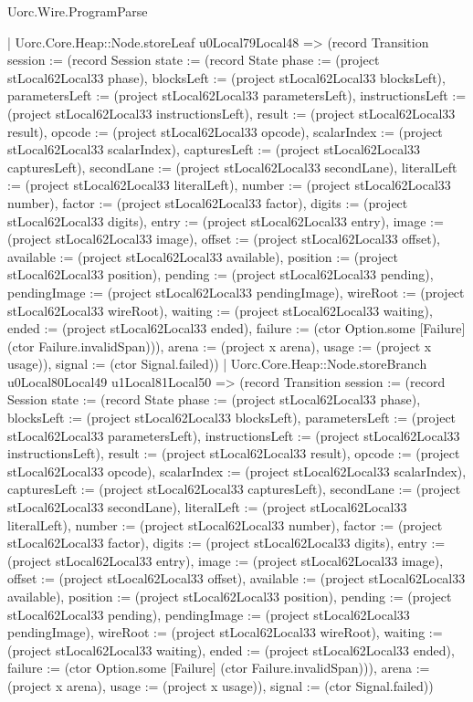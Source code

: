 \begin{lexlean}{Uorc.Wire.ProgramParse}
\begin{semanticmodule}
{        | Uorc.Core.Heap::Node.storeLeaf u0Local79Local48 => (record Transition {session := (record Session {state := (record State {phase := (project stLocal62Local33 phase), blocksLeft := (project stLocal62Local33 blocksLeft), parametersLeft := (project stLocal62Local33 parametersLeft), instructionsLeft := (project stLocal62Local33 instructionsLeft), result := (project stLocal62Local33 result), opcode := (project stLocal62Local33 opcode), scalarIndex := (project stLocal62Local33 scalarIndex), capturesLeft := (project stLocal62Local33 capturesLeft), secondLane := (project stLocal62Local33 secondLane), literalLeft := (project stLocal62Local33 literalLeft), number := (project stLocal62Local33 number), factor := (project stLocal62Local33 factor), digits := (project stLocal62Local33 digits), entry := (project stLocal62Local33 entry), image := (project stLocal62Local33 image), offset := (project stLocal62Local33 offset), available := (project stLocal62Local33 available), position := (project stLocal62Local33 position), pending := (project stLocal62Local33 pending), pendingImage := (project stLocal62Local33 pendingImage), wireRoot := (project stLocal62Local33 wireRoot), waiting := (project stLocal62Local33 waiting), ended := (project stLocal62Local33 ended), failure := (ctor Option.some [Failure] (ctor Failure.invalidSpan))}), arena := (project x arena), usage := (project x usage)}), signal := (ctor Signal.failed)})
        | Uorc.Core.Heap::Node.storeBranch u0Local80Local49 u1Local81Local50 => (record Transition {session := (record Session {state := (record State {phase := (project stLocal62Local33 phase), blocksLeft := (project stLocal62Local33 blocksLeft), parametersLeft := (project stLocal62Local33 parametersLeft), instructionsLeft := (project stLocal62Local33 instructionsLeft), result := (project stLocal62Local33 result), opcode := (project stLocal62Local33 opcode), scalarIndex := (project stLocal62Local33 scalarIndex), capturesLeft := (project stLocal62Local33 capturesLeft), secondLane := (project stLocal62Local33 secondLane), literalLeft := (project stLocal62Local33 literalLeft), number := (project stLocal62Local33 number), factor := (project stLocal62Local33 factor), digits := (project stLocal62Local33 digits), entry := (project stLocal62Local33 entry), image := (project stLocal62Local33 image), offset := (project stLocal62Local33 offset), available := (project stLocal62Local33 available), position := (project stLocal62Local33 position), pending := (project stLocal62Local33 pending), pendingImage := (project stLocal62Local33 pendingImage), wireRoot := (project stLocal62Local33 wireRoot), waiting := (project stLocal62Local33 waiting), ended := (project stLocal62Local33 ended), failure := (ctor Option.some [Failure] (ctor Failure.invalidSpan))}), arena := (project x arena), usage := (project x usage)}), signal := (ctor Signal.failed)})
}
\end{semanticmodule}
\end{lexlean}
